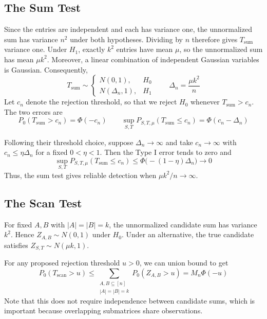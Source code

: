 \documentclass[12pt]{article}
\begin{document}
\subsection{The Sum Test}\label{app:sum}

Since the entries are independent and each has variance one, the
unnormalized sum has variance $n^2$ under both hypotheses. Dividing
by $n$ therefore gives $T_{\mathrm{sum}}$ variance one. Under $H_1$,
exactly $k^2$ entries have mean $\mu$, so the unnormalized sum has
mean $\mu k^2$. Moreover, a linear combination of independent
Gaussian variables is Gaussian. Consequently,
\[
T_{\mathrm{sum}}\sim
\begin{cases}
N(0,1), & H_0\\[2pt]
N(\Delta_n,1), & H_1
\end{cases}
\qquad \Delta_n=\frac{\mu k^2}{n}
\]
Let $c_n$ denote the rejection threshold, so that we reject $H_0$
whenever $T_{\mathrm{sum}}>c_n$. The two errors are
\[
P_0(T_{\mathrm{sum}}>c_n)=\Phi(-c_n)
\qquad
\sup_{S,T}P_{S,T,\mu}(T_{\mathrm{sum}}\leq c_n)
=\Phi(c_n-\Delta_n)
\]

Following their threshold choice, suppose $\Delta_n\to\infty$ and
take $c_n\to\infty$ with $c_n\leq\eta\Delta_n$ for a fixed
$0<\eta<1$. Then the Type I error tends to zero and
\[
\sup_{S,T}P_{S,T,\mu}(T_{\mathrm{sum}}\leq c_n)
\leq\Phi\bigl(-(1-\eta)\Delta_n\bigr)\longrightarrow0
\]
Thus, the sum test gives reliable detection when $\mu k^2/n\to\infty$.

\subsection{The Scan Test}\label{app:scan}

For fixed $A,B$ with $|A|=|B|=k$, the unnormalized candidate sum
has variance $k^2$. Hence $Z_{A,B}\sim N(0,1)$ under $H_0$.
Under an alternative, the true candidate satisfies
$Z_{S,T}\sim N(\mu k,1)$.

For any proposed rejection threshold $u>0$, we can union bound to get
\[
P_0(T_{\mathrm{scan}}>u)
\leq\sum_{\substack{A,B\subseteq[n]\\|A|=|B|=k}}
P_0(Z_{A,B}>u)
=M_n\Phi(-u)
\]
Note that this does not require independence between candidate sums, which is
important because overlapping submatrices share observations.
\end{document}
